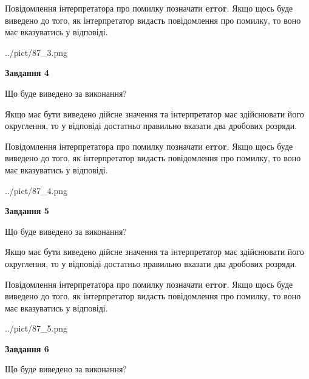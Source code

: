 \documentclass[12pt, ukrainian]{article}
\begin{document}
{\begin {Large}
Повідомлення інтерпретатора про помилку позначати \textbf{error}.
Якщо щось буде виведено до того, як інтерпретатор видасть повідомлення про помилку, 
то воно має вказуватись у відповіді. \par

\begin{center}
	{../pict/87_3.png}
\end{center}
\newpage

{\begin {center}\textbf{Завдання 4}\end {center}}\par
Що буде виведено за виконання? \par

Якщо має бути виведено дійсне значення та інтерпретатор має здійснювати його округлення, 
то у відповіді достатньо правильно вказати два дробових розряди.

Повідомлення інтерпретатора про помилку позначати \textbf{error}.
Якщо щось буде виведено до того, як інтерпретатор видасть повідомлення про помилку, 
то воно має вказуватись у відповіді. \par

\begin{center}
	{../pict/87_4.png}
\end{center}
\newpage

{\begin {center}\textbf{Завдання 5}\end {center}}\par
Що буде виведено за виконання? \par

Якщо має бути виведено дійсне значення та інтерпретатор має здійснювати його округлення, 
то у відповіді достатньо правильно вказати два дробових розряди.

Повідомлення інтерпретатора про помилку позначати \textbf{error}.
Якщо щось буде виведено до того, як інтерпретатор видасть повідомлення про помилку, 
то воно має вказуватись у відповіді. \par

\begin{center}
	{../pict/87_5.png}
\end{center}
\newpage

{\begin {center}\textbf{Завдання 6}\end {center}}\par
Що буде виведено за виконання? \par


\end{Large}}
\end{document}

